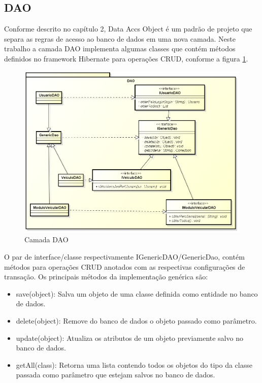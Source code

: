 \subsection{DAO}

Conforme descrito no capítulo 2, Data Accs Object é um padrão de projeto que separa as regras de acesso ao banco de dados em uma nova camada. Neste trabalho a camada DAO implementa algumas classes que contém métodos definidos no framework Hibernate para operações CRUD, conforme a figura \ref{fig:webmandao}.

\begin{figure}[!htb]
	\centering
	\includegraphics[width=\textwidth]{figures/dao_layer.png}
	\caption{Camada DAO}
	\label{fig:webmandao}
\end{figure}

O par de interface/classe respectivamente IGenericDAO/GenericDao, contém métodos para operações CRUD anotados com as respectivas configurações de transação. Os principais métodos da implementação genérica são:

\begin{itemize}
	\item save(object): Salva um objeto de uma classe definida como entidade no banco de dados.
	\item delete(object): Remove do banco de dados o objeto passado como parâmetro.
	\item update(object): Atualiza os atributos de um objeto previamente salvo no banco de dados.
	\item getAll(class): Retorna uma lista contendo todos os objetos do tipo da classe passada como parâmetro que estejam salvos no banco de dados.
\end{itemize}

